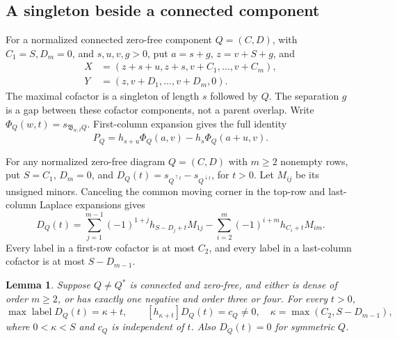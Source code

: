 \documentclass[11pt,a4paper]{amsart}
\numberwithin{equation}{section}
\theoremstyle{plain}
\newtheorem{lemma}[theorem]{Lemma}
\theoremstyle{definition}
\newcommand{\B}{\mathfrak B}
\begin{document}
\subsection{A singleton beside a connected component}

For a normalized connected zero-free component \(Q=(C,D)\), with
\(C_1=S,D_m=0\), and \(s,u,v,g>0\), put \(a=s+g\), \(z=v+S+g\), and
\begin{equation}\label{eq:singleton-context}
 \begin{aligned}
 X&=(z+s+u,z+s,v+C_1,\ldots,v+C_m),\\
 Y&=(z,v+D_1,\ldots,v+D_m,0).
 \end{aligned}
\end{equation}
The maximal cofactor is a singleton of length \(s\) followed by \(Q\).
The separation \(g\) is a gap between these cofactor components, not a
parent overlap.  Write \(\Phi_Q(w,t)=s_{\B_{w,t}Q}\).  First-column
expansion gives the full identity
\begin{equation}\label{eq:singleton-polynomial}
 P_Q=h_{s+u}\Phi_Q(a,v)-h_s\Phi_Q(a+u,v).
\end{equation}

For any normalized zero-free diagram \(Q=(C,D)\) with \(m\ge2\) nonempty
rows, put \(S=C_1\), \(D_m=0\), and
\(D_Q(t)=s_{Q^{\uparrow t}}-s_{Q^{\downarrow t}}\), for \(t>0\).
Let \(M_{ij}\) be its unsigned minors.  Canceling the common moving
corner in the top-row and last-column Laplace expansions gives
\begin{equation}\label{eq:levels}
 D_Q(t)=\sum_{j=1}^{m-1}(-1)^{1+j}h_{S-D_j+t}M_{1j}
       -\sum_{i=2}^{m}(-1)^{i+m}h_{C_i+t}M_{im}.
\end{equation}
Every label in a first-row cofactor is at most \(C_2\), and every label
in a last-column cofactor is at most \(S-D_{m-1}\).

\begin{lemma}\label{lem:endpoint-top}
Suppose \(Q\ne Q^*\) is connected and zero-free, and either is dense of
order \(m\ge2\), or has exactly one negative and order three or four.
For every \(t>0\),
\begin{equation}\label{eq:endpoint-top}
 \max\operatorname{label}D_Q(t)=\kappa+t,
 \qquad [h_{\kappa+t}]D_Q(t)=c_Q\ne0,\quad \kappa=\max(C_2,S-D_{m-1}),
\end{equation}
where \(0<\kappa<S\) and \(c_Q\) is independent of \(t\).
Also \(D_Q(t)=0\) for symmetric \(Q\).
\end{lemma}
\end{document}
